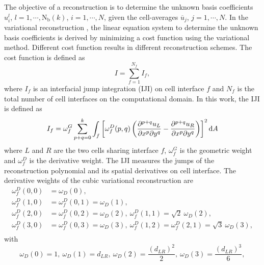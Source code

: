 The objective of a reconstruction is to determine the unknown basis coefficients $u_i^l$,  $l=1,\cdots,\mathrm{N_b}\left(k\right)$, $i=1,\cdots,N$, given the cell-averages $\overline{u}_j$, $j=1,\cdots,N$. In the variational reconstruction \cite{wang2017compact_VR}, the linear equation system to determine the unknown basis coefficients is derived by minimizing a cost function using the variational method. Different cost function results in different reconstruction schemes. The cost function is defined as
\begin{equation}
    \label{eq:cost-function}
    I = \sum^{N_f}_{f=1} {I_f},
\end{equation}
where $I_f$ is an interfacial jump integration (IJI) on cell interface $f$ and $N_f$ is the total number of cell interfaces on the computational domain.
In this work, the IJI is defined as
\begin{equation}
    \label{eq:IJI}
    I_f = \omega_f^G \sum_{p+q=0}^{k} \int_{f}{
        \left[
            \omega_f^D(p,q)
            \left(
            \partialderivative{^{p+q}u_L}{x^p\partial y^q}
            -
            \partialderivative{^{p+q}u_R}{x^p\partial y^q}
            \right)
            \right]^2
        \dd A
    }
\end{equation}
where $L$ and $R$ are the two cells sharing interface $f$, $\omega_f^G$ is the geometric weight and
$\omega_f^D$ is the derivative weight. The IJI measures the jumps of the reconstruction polynomial and its spatial derivatives on cell interface.
The derivative weights of the cubic variational reconstruction are
\begin{equation}
    \begin{aligned}
        \omega_f^D(0,0) & = \omega_D(0),                                                                               \\
        \omega_f^D(1,0) & = \omega_f^D(0,1) = \omega_D(1) ,                                                            \\
        \omega_f^D(2,0) & = \omega_f^D(0,2) = \omega_D(2),\ \omega_f^D(1,1) = \sqrt{2}\ \omega_D(2)  ,                 \\
        \omega_f^D(3,0) & = \omega_f^D(0,3) = \omega_D(3),\ \omega_f^D(1,2) = \omega_f^D(2,1) = \sqrt{3}\ \omega_D(3), \\
    \end{aligned}
    \label{eq:wdRotRatio}
\end{equation}
with
\begin{equation}
    \omega_D(0) = 1, \ \omega_D(1) = d_{LR}, \ \omega_D(2) = \frac{\left(d_{LR}\right)^2}{2}, \ \omega_D(3) = \frac{\left(d_{LR}\right)^3}{6},
    \label{eq:wdHQMOPT}
\end{equation}
